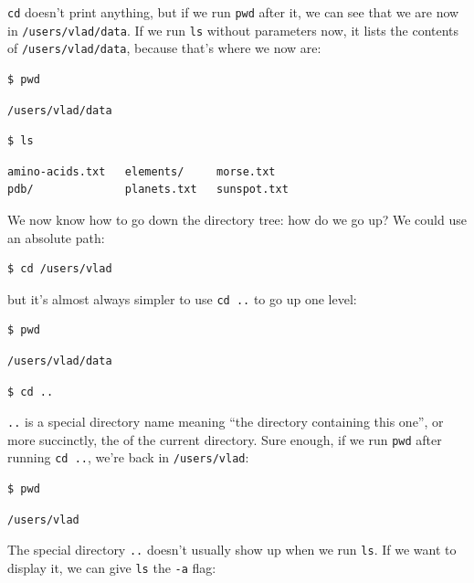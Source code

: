 \documentclass{book}
\begin{document}
\texttt{cd} doesn't print anything, but if we run \texttt{pwd} after it,
we can see that we are now in \texttt{/users/vlad/data}. If we run
\texttt{ls} without parameters now, it lists the contents of
\texttt{/users/vlad/data}, because that's where we now are:

\begin{verbatim}
$ pwd
\end{verbatim}

\begin{verbatim}
/users/vlad/data
\end{verbatim}

\begin{verbatim}
$ ls
\end{verbatim}

\begin{verbatim}
amino-acids.txt   elements/     morse.txt
pdb/              planets.txt   sunspot.txt
\end{verbatim}

We now know how to go down the directory tree: how do we go up? We could
use an absolute path:

\begin{verbatim}
$ cd /users/vlad
\end{verbatim}

but it's almost always simpler to use \texttt{cd ..} to go up one level:

\begin{verbatim}
$ pwd
\end{verbatim}

\begin{verbatim}
/users/vlad/data
\end{verbatim}

\begin{verbatim}
$ cd ..
\end{verbatim}

\texttt{..} is a special directory name meaning ``the directory
containing this one'', or more succinctly, the
 of the current directory. Sure
enough, if we run \texttt{pwd} after running \texttt{cd ..}, we're back
in \texttt{/users/vlad}:

\begin{verbatim}
$ pwd
\end{verbatim}

\begin{verbatim}
/users/vlad
\end{verbatim}

The special directory \texttt{..} doesn't usually show up when we run
\texttt{ls}. If we want to display it, we can give \texttt{ls} the
\texttt{-a} flag:
\end{document}
